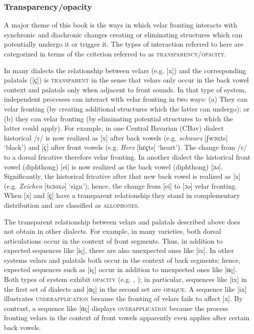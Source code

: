 \subsubsection{Transparency/opacity} A major theme of this book is the ways in which velar fronting interacts with synchronic and diachronic changes creating or eliminating structures which can potentially undergo it or trigger it. The types of interaction referred to here are categorized in terms of the criterion referred to as \textsc{transparency}\slash\textsc{opacity}.

In many dialects the relationship between velars (e.g. [x]) and the corresponding palatals ([{ҫ}]) is \textsc{transparent} in the sense that velars only occur in the back vowel context and palatals only when adjacent to front sounds. In that type of system, independent processes can interact with velar fronting in two ways: (a) They can \textsc{} velar fronting (by creating additional structures which the latter can undergo); or (b) they can \textsc{} velar fronting (by eliminating potential structures to which the latter could apply). For example, in one Central Bavarian (CBav) dialect historical /r/ is now realized as [x] after back vowels (e.g. \textit{schwarz} [ʃwɔxts] ‘black’) and [{ҫ}] after front vowels (e.g. \textit{Herz} [hɛ{ҫts] ‘heart’)}. The change from /r/ to a dorsal fricative therefore  velar fronting. In another dialect the historical front vowel (diphthong) [ei] is now realized as the back vowel (diphthong) [ɔə]. Significantly, the historical fricative after that new back vowel is realized as [x] (e.g. \textit{Zeichen} [tsɔəxə] ‘sign’); hence, the change from [ei] to [ɔə]  velar fronting. When [x] and [{ҫ] have a transparent relationship they stand in complementary distribution and are classified as} \textsc{allophones}.

The transparent relationship between velars and palatals described above does not obtain in other dialects. For example, in many varieties, both dorsal articulations occur in the context of front segments. Thus, in addition to expected sequences like [iç], there are also unexpected ones like [ix]. In other systems velars and palatals both occur in the context of back segments; hence, expected sequences such as [iç] occur in addition to unexpected ones like [ɑç]. Both types of system exhibit \textsc{opacity} (e.g. \citealt{Kiparsky1982a}, \citealt{McCarthy2009, Baković2011}); in particular, sequences like [ix] in the first set of dialects and [ɑç] in the second set are \textsc{opaque}. A sequence like [ix] illustrates \textsc{underapplication} because the fronting of velars fails to affect [x]. By contrast, a sequence like [ɑç] displays \textsc{overapplication} because the process fronting velars in the context of front vowels apparently even applies after certain back vowels.

